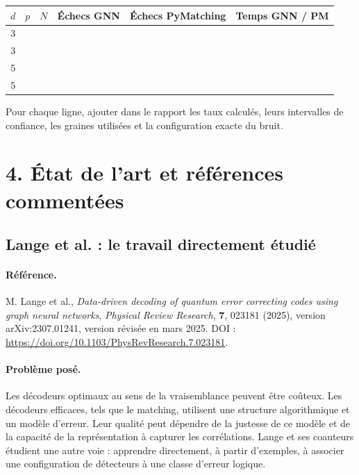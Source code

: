 \documentclass[11pt,a4paper]{article}
\begin{document}
\begin{center}
\begin{tabularx}{\textwidth}{c c c c c c}
\toprule
$d$ & $p$ & $N$ & Échecs GNN & Échecs PyMatching & Temps GNN / PM \\
\midrule
3 & & & & & \\
3 & & & & & \\
5 & & & & & \\
5 & & & & & \\
\bottomrule
\end{tabularx}
\end{center}

Pour chaque ligne, ajouter dans le rapport les taux calculés, leurs
intervalles de confiance, les graines utilisées et la configuration exacte
du bruit.

\section{4. État de l'art et références commentées}

\subsection{Lange et al. : le travail directement étudié}

\paragraph{Référence.}
M. Lange et al., \emph{Data-driven decoding of quantum error correcting
codes using graph neural networks}, \emph{Physical Review Research},
\textbf{7}, 023181 (2025), version arXiv:2307.01241, version révisée en
mars 2025. DOI : \url{https://doi.org/10.1103/PhysRevResearch.7.023181}.

\paragraph{Problème posé.}
Les décodeurs optimaux au sens de la vraisemblance peuvent être coûteux.
Les décodeurs efficaces, tels que le matching, utilisent une structure
algorithmique et un modèle d'erreur. Leur qualité peut dépendre de la
justesse de ce modèle et de la capacité de la représentation à capturer les
corrélations. Lange et ses coauteurs étudient une autre voie : apprendre
directement, à partir d'exemples, à associer une configuration de détecteurs
à une classe d'erreur logique.
\end{document}

